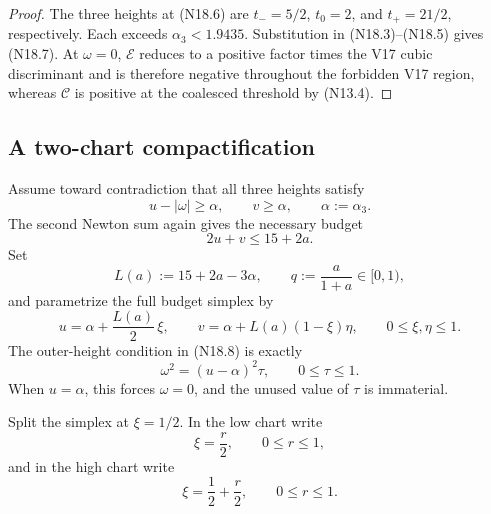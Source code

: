 \documentclass[11pt]{article}
\theoremstyle{definition}
\theoremstyle{remark}
\begin{document}
\begin{proof}
The three heights at \textup{(N18.6)} are
\(t_-=5/2\), \(t_0=2\), and \(t_+=21/2\), respectively.  Each exceeds
\(\alpha_3<1.9435\).
Substitution in \textup{(N18.3)}--\textup{(N18.5)} gives
\textup{(N18.7)}.  At \(\omega=0\), \(\mathcal E\) reduces to a positive
factor times the V17 cubic discriminant and is therefore negative
throughout the forbidden V17 region, whereas \(\mathcal C\) is positive
at the coalesced threshold by \textup{(N13.4)}.
\end{proof}

\subsection{A two-chart compactification}

Assume toward contradiction that all three heights satisfy
\[
 u-|\omega|\geq\alpha,\qquad v\geq\alpha,
 \qquad \alpha:=\alpha_3.
 \tag{N18.8}
\]
The second Newton sum again gives the necessary budget
\[
 2u+v\leq15+2a.
 \tag{N18.9}
\]
Set
\[
 L(a):=15+2a-3\alpha,
 \qquad
 q:=\frac{a}{1+a}\in[0,1),
 \tag{N18.10}
\]
and parametrize the full budget simplex by
\[
 u=\alpha+\frac{L(a)}2\,\xi,
 \qquad
 v=\alpha+L(a)(1-\xi)\eta,
 \qquad 0\leq\xi,\eta\leq1.
 \tag{N18.11}
\]
The outer-height condition in \textup{(N18.8)} is exactly
\[
 \omega^2=(u-\alpha)^2\tau,
 \qquad 0\leq\tau\leq1.
 \tag{N18.12}
\]
When \(u=\alpha\), this forces \(\omega=0\), and the unused value of
\(\tau\) is immaterial.

Split the simplex at \(\xi=1/2\).  In the low chart write
\[
 \xi=\frac r2,\qquad 0\leq r\leq1,
 \tag{N18.13}
\]
and in the high chart write
\[
 \xi=\frac12+\frac r2,\qquad 0\leq r\leq1.
 \tag{N18.14}
\]
\end{document}

